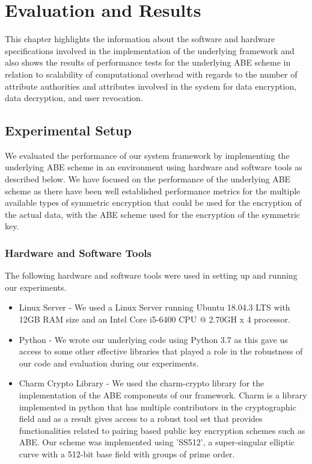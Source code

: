 \chapter{Evaluation and Results}
\label{chap:evaluation_and_results}

This chapter highlights the information about the software and hardware specifications involved in the implementation of the underlying framework and also shows the results of performance tests for the underlying ABE scheme in relation to scalability of computational overhead with regards to the number of attribute authorities and attributes involved in the system for data encryption, data decryption, and user revocation.

\section{Experimental Setup}

We evaluated the performance of our system framework by implementing the underlying ABE scheme in an environment using hardware and software tools as described below. We have focused on the performance of the underlying ABE scheme as there have been well established performance metrics for the multiple available types of symmetric encryption that could be used for the encryption of the actual data, with the ABE scheme used for the encryption of the symmetric key. 

\subsection{Hardware and Software Tools}

The following hardware and software tools were used in setting up and running our experiments.

\begin{itemize}
	\item Linux Server - We used a Linux Server running Ubuntu 18.04.3 LTS with 12GB RAM size and an Intel Core i5-6400 CPU @ 2.70GH x 4 processor.
	
	\item Python - We wrote our underlying code using Python 3.7 as this gave us access to some other effective libraries that played a role in the robustness of our code and evaluation during our experiments.
	
	\item Charm Crypto Library\cite{charm13crypto} - We used the charm-crypto library for the implementation of the ABE components of our framework. Charm is a library implemented in python that has multiple contributors in the cryptographic field and as a result gives access to a robust tool set that provides functionalities related to pairing based public key encryption schemes such as ABE. Our scheme was implemented using 'SS512', a super-singular elliptic curve with a 512-bit base field with groups of prime order.
\end{itemize}

